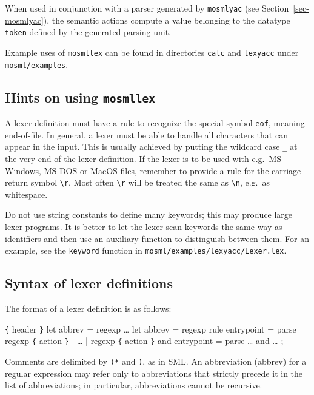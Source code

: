 \documentclass[fleqn]{article}
\begin{document}
When used in conjunction with a parser generated by {\tt mosmlyac}
(see Section~\ref{sec-mosmlyac}), the semantic actions compute a value
belonging to the datatype {\tt token} defined by the generated parsing
unit.

Example uses of {\tt mosmllex} can be found in directories {\tt calc}
and {\tt lexyacc} under {\tt mosml/examples}.


\subsection{Hints on using {\tt mosmllex}}

A lexer definition must have a rule to recognize the special symbol
{\tt eof}, meaning end-of-file.  In general, a lexer must be able to
handle all characters that can appear in the input.  This is usually
achieved by putting the wildcard case \verb#_# at the very end of the
lexer definition.  If the lexer is to be used with e.g.\ MS Windows,
MS DOS or MacOS files, remember to provide a rule for the
carriage-return symbol \verb#\r#.  Most often \verb#\r# will be
treated the same as \verb#\n#, e.g.\ as whitespace.

Do not use string constants to define many keywords; this may produce
large lexer programs.  It is better to let the lexer scan keywords the
same way as identifiers and then use an auxiliary function to
distinguish between them.  For an example, see the {\tt keyword}
function in {\tt mosml/examples/lexyacc/Lexer.lex}.


\subsection{Syntax of lexer definitions}

The format of a lexer definition is as follows:

\begin{program}
\verb#{# {\rm header} \verb#}#
let {\rm abbrev} = {\rm regexp}
\ldots
let {\rm abbrev} = {\rm regexp}
rule {\rm entrypoint} =
  parse {\rm regexp} \verb#{# {\rm action} \verb#}#
      | \ldots
      | {\rm regexp} \verb#{# {\rm action} \verb#}#
and {\rm entrypoint} =
  parse \ldots
and \ldots
;
\end{program}

\noindent Comments are delimited by {\tt (*} and {\tt *)}, as in
SML\@.  An abbreviation (abbrev) for a regular expression may refer
only to abbreviations that strictly precede it in the list of
abbreviations; in particular, abbreviations cannot be recursive.
\end{document}
